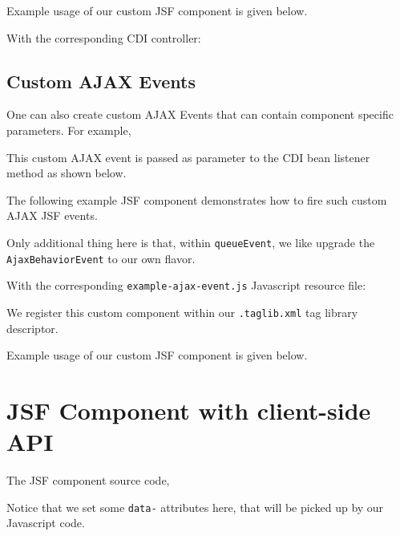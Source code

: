 Example usage of our custom JSF component is given below.


With the corresponding CDI controller:


\subsection{Custom AJAX Events}

One can also create custom AJAX Events that can contain component specific parameters.
For example,


This custom AJAX event is passed as parameter to the CDI bean listener method as shown below.


The following example JSF component demonstrates how to fire such custom AJAX JSF events.

Only additional thing here is that, within \texttt{queueEvent}, we like upgrade the \texttt{AjaxBehaviorEvent} to our own flavor.

With the corresponding \texttt{example-ajax-event.js} Javascript resource file:


We register this custom component within our \texttt{.taglib.xml} tag library descriptor.


Example usage of our custom JSF component is given below.


\section{JSF Component with client-side API}
The JSF component source code,

Notice that we set some \texttt{data-} attributes here, that will be picked up by our Javascript code.

